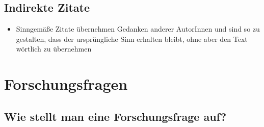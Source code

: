 \documentclass{article}
\begin{document}
	\subsection{Indirekte Zitate}
	\begin{itemize}
		\item{Sinngemäße Zitate übernehmen Gedanken anderer AutorInnen und sind so zu gestalten, dass der ursprüngliche Sinn erhalten bleibt, ohne aber den Text wörtlich zu übernehmen}
	\end{itemize}

	\section{Forschungsfragen}
	\subsection{Wie stellt man eine Forschungsfrage auf?}
\end{document}
